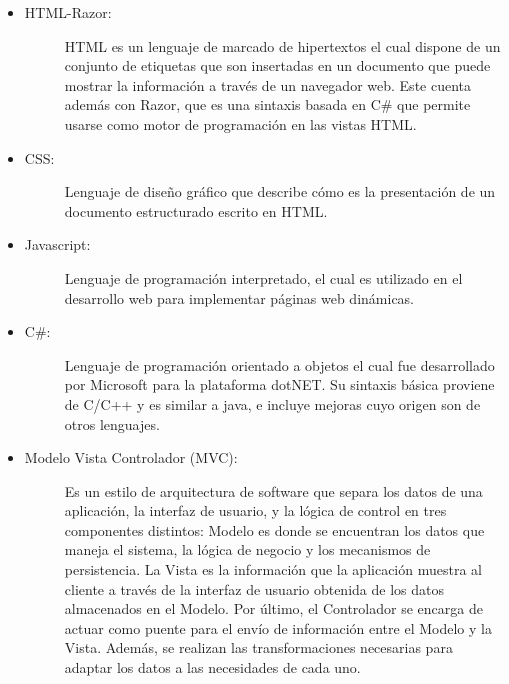 \begin{itemize}
    \item   \begin{description}
                \item[HTML-Razor:] HTML es un lenguaje de marcado de hipertextos el cual dispone de un conjunto de etiquetas que son insertadas en un documento que puede mostrar la información a través de un navegador web. Este cuenta además con Razor, que es una sintaxis basada en C\# que permite usarse como motor de programación en las vistas HTML. 
            \end{description}

    \item   \begin{description}
                \item[CSS:] Lenguaje de diseño gráfico que describe cómo es la presentación de un documento estructurado escrito en HTML. 
            \end{description}

    \item   \begin{description}
                \item[Javascript:] Lenguaje de programación interpretado, el cual es utilizado en el desarrollo web para implementar páginas web dinámicas.
            \end{description}

    \item   \begin{description}
                \item[C\#:] Lenguaje de programación orientado a objetos el cual fue desarrollado por Microsoft para la plataforma dotNET. Su sintaxis básica proviene de C/C++ y es similar a java, e incluye mejoras cuyo origen son de otros lenguajes.
            \end{description}
    
    \item   \begin{description}
                \item[Modelo Vista Controlador (MVC):]   Es un estilo de arquitectura de software que separa los datos de una aplicación, la interfaz de usuario, y la lógica de control en tres componentes distintos: Modelo es donde se encuentran los datos que maneja el sistema, la lógica de negocio y los mecanismos de persistencia. La Vista es la información que la aplicación muestra al cliente a través de la interfaz de usuario obtenida de los datos almacenados en el Modelo. Por último, el Controlador se encarga de actuar como puente para el envío de información entre el Modelo y la Vista. Además, se realizan las transformaciones necesarias para adaptar los datos a las necesidades de cada uno.
            \end{description}
\end{itemize}
